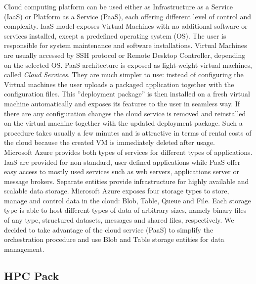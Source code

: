 \documentclass[3p,times]{elsarticle}
\begin{document}
Cloud computing platform can be used either as Infrastructure as a Service (IaaS) or Platform as a Service (PaaS), each offering different level of control and complexity. IaaS model exposes Virtual Machines with no additional software or services installed, except a predefined operating system (OS). The user is responsible for system maintenance and software installations. Virtual Machines are usually accessed by SSH protocol or Remote Desktop Controller, depending on the selected OS. PaaS architecture is exposed as light-weight virtual machines, called {\it Cloud Services}. They are much simpler to use: instead of configuring the Virtual machines the user uploads a packaged application together with the configuration files. This ''deployment package'' is then installed on a fresh virtual machine automatically and exposes its features to the user in seamless way. If there are any configuration changes the cloud service is removed and reinstalled on the virtual machine together with the updated deployment package. Such a procedure takes usually a few minutes and is  attractive in terms of rental costs of the cloud because the created VM is immediately deleted after usage. \\
Microsoft Azure provides both types of services for different types of applications. IaaS are provided for non-standard, user-defined applications while PaaS offer easy access to mostly used services such as web servers, applications server or message brokers. Separate entities provide infrastructure for highly available and scalable data storage. Microsoft Azure exposes four storage types to store, manage and control data in the cloud: Blob, Table, Queue and File. Each storage type is able to host different types of data of arbitrary sizes, namely binary files of any type, structured datasets, messages and shared files, respectively. We decided to take advantage of the cloud service (PaaS) to simplify the orchestration procedure and use Blob and Table storage entities for data management. 

\subsection{HPC Pack}
\end{document}
